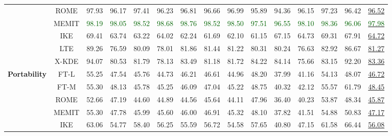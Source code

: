 \begin{table*}[!h]
{\begin{tabular}{ccccccccccccccc}
            & ROME & 97.93 & 96.17 & 97.41 & 96.23 & 96.81 & 96.66 & 96.99 & 95.89 & 94.36 & 96.15 & 97.23 & 96.42 & \underline{96.52} \\
            & MEMIT & \textcolor{darkgreen}{98.19} & \textcolor{darkgreen}{98.05} & \textcolor{darkgreen}{98.52} & \textcolor{darkgreen}{98.68} & \textcolor{darkgreen}{98.76} & \textcolor{darkgreen}{98.52} & \textcolor{darkgreen}{98.50} & \textcolor{darkgreen}{97.51} & \textcolor{darkgreen}{96.55} & \textcolor{darkgreen}{98.10} & \textcolor{darkgreen}{98.36} & \textcolor{darkgreen}{96.06} & \underline{\textcolor{darkgreen}{97.98}} \\
            & IKE & 69.41 & 63.74 & 63.22 & 64.02 & 62.24 & 61.69 & 62.10 & 61.15 & 67.15 & 64.73 & 69.31 & 67.91 & \underline{64.72} \\
            & LTE & 89.26 & 76.59 & 80.09 & 78.01 & 81.86 & 81.44 & 81.22 & 80.31 & 80.24 & 76.63 & 82.92 & 86.67 & \underline{81.27 }\\
           \cmidrule{2-15}
            & X-KDE & 94.07 & 80.53 & 81.79 & 78.13 & 83.49 & 81.18 & 81.72 & 84.22 & 84.14 & 75.66 & 83.15 & 92.20 & \underline{83.36 }\\
           \midrule
           \multirow{7}{*}{\textbf{Portability}} 
            & FT-L & 55.25 & 47.54 & 45.76 & 44.73 & 46.21 & 46.61 & 44.96 & 48.20 & 37.99 & 41.16 & 54.13 & 48.07 & \underline{46.72} \\
            & FT-M & 55.30 & 48.13 & 45.78 & 45.25 & 46.09 & 47.04 & 45.22 & 48.75 & 40.32 & 42.12 & 55.57 & 61.79 & \underline{48.45} \\
            & ROME & 52.66 & 47.19 & 44.60 & 44.89 & 44.56 & 45.64 & 44.11 & 47.96 & 36.40 & 40.23 & 53.87 & 48.34 & \underline{45.87} \\
            & MEMIT & 55.30 & 47.78 & 45.99 & 45.60 & 46.00 & 46.91 & 45.32 & 48.10 & 37.82 & 41.51 & 54.88 & 50.83 & \underline{47.17} \\
            & IKE & 63.06 & 54.77 & 58.40 & 56.25 & 55.59 & 56.72 & 54.58 & 57.65 & 40.80 & 47.15 & 61.58 & 66.44 & \underline{56.08} \\

\end{tabular}}
\end{table*}
